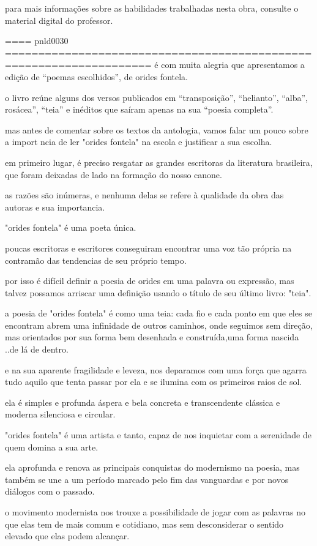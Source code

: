 para mais informações sobre as
habilidades trabalhadas nesta obra, consulte o material digital do professor.


==== pnld0030 ====================================================================
é com muita alegria que apresentamos a edição de “poemas escolhidos”, de orides fontela.


o livro reúne alguns dos versos publicados em “transposição”, “helianto”, “alba”, rosácea”, “teia” e inéditos que saíram apenas na sua “poesia completa”.


mas antes de comentar sobre os textos da antologia, vamos falar um pouco sobre a import ncia de ler "orides fontela" na escola e justificar a sua escolha.


em primeiro lugar, é preciso resgatar as grandes escritoras da literatura brasileira, que foram deixadas de lado na formação do nosso canone.


as razões são inúmeras, e nenhuma delas se refere à qualidade da obra das autoras e sua importancia.

"orides fontela" é uma poeta única.

poucas escritoras e escritores conseguiram encontrar uma voz tão própria na contramão das tendencias de seu próprio tempo.


por isso é difícil definir a poesia de orides em uma palavra ou expressão,  mas talvez possamos arriscar uma definição usando o título de seu último livro: "teia".

a poesia de "orides fontela" é como uma teia:  cada fio e cada ponto em que eles se encontram abrem uma infinidade de outros caminhos, onde seguimos sem direção, mas orientados por sua forma bem desenhada e construída,uma forma nascida ..de lá de dentro.

e na sua aparente fragilidade e leveza, nos deparamos com uma força que agarra tudo aquilo que tenta passar por ela e se ilumina com os primeiros raios de sol.

ela é simples e profunda
áspera e bela 
concreta e transcendente
clássica e moderna
silenciosa e circular.

"orides fontela" é uma artista e tanto, capaz de nos inquietar com a serenidade de quem domina a sua arte.


ela aprofunda e renova as principais conquistas do modernismo na poesia, mas também se une a um período marcado pelo fim das vanguardas e por novos diálogos com o passado.


o movimento modernista nos trouxe a possibilidade de jogar com as palavras no que elas tem de mais comum e cotidiano, mas sem desconsiderar o sentido elevado que elas podem alcançar.

